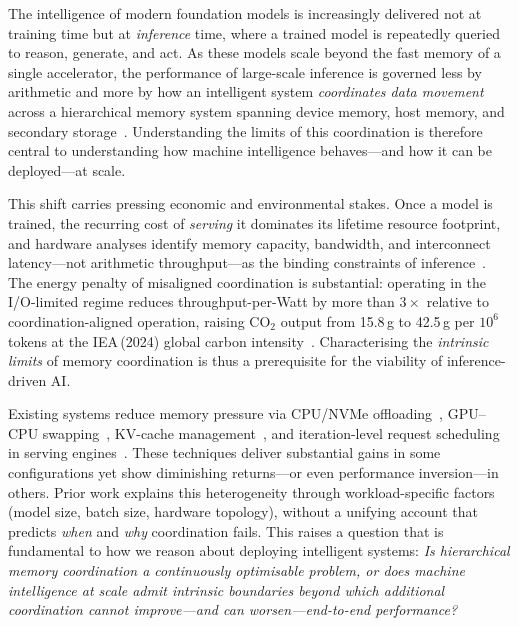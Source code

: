 
\label{sec:introduction}

The intelligence of modern foundation models is increasingly delivered not at
training time but at \emph{inference} time, where a trained model is repeatedly
queried to reason, generate, and act.
As these models scale beyond the fast memory of a single accelerator, the
performance of large-scale inference is governed less by arithmetic and more by
how an intelligent system \emph{coordinates data movement} across a hierarchical
memory system spanning device memory, host memory, and secondary
storage~\cite{ma2026inference,gholami2024memorywall}.
Understanding the limits of this coordination is therefore central to
understanding how machine intelligence behaves---and how it can be deployed---at
scale.

This shift carries pressing economic and environmental stakes.
Once a model is trained, the recurring cost of \emph{serving} it dominates its
lifetime resource footprint, and hardware analyses identify memory capacity,
bandwidth, and interconnect latency---not arithmetic throughput---as the binding
constraints of inference~\cite{zhou2024survey}.
The energy penalty of misaligned coordination is substantial: operating in the
I/O-limited regime reduces throughput-per-Watt by more than $3\times$ relative to
coordination-aligned operation, raising CO$_2$ output from 15.8\,g to 42.5\,g per
$10^6$ tokens at the IEA\,(2024) global carbon
intensity~\cite{iea2024electricity}.
Characterising the \emph{intrinsic limits} of memory coordination is thus a
prerequisite for the viability of inference-driven AI.

Existing systems reduce memory pressure via CPU/NVMe
offloading~\cite{flexgen2023,aminabadi2022deepspeedinference},
GPU--CPU swapping~\cite{huang2020swapadvisor},
KV-cache management~\cite{kwon2023pagedattention},
and iteration-level request scheduling in serving engines~\cite{yu2022orca}.
These techniques deliver substantial gains in some configurations yet show
diminishing returns---or even performance inversion---in others.
Prior work explains this heterogeneity through workload-specific factors
(model size, batch size, hardware topology), without a unifying account that
predicts \emph{when} and \emph{why} coordination fails.
This raises a question that is fundamental to how we reason about deploying
intelligent systems: \emph{Is hierarchical memory coordination a continuously
optimisable problem, or does machine intelligence at scale admit intrinsic
boundaries beyond which additional coordination cannot improve---and can
worsen---end-to-end performance?}

